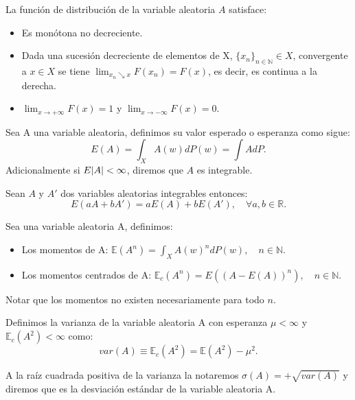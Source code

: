 \documentclass[../proyecto.tex]{memoir}
\begin{document}
\begin{prop}
La función de distribución de la variable aleatoria $A$ satisface:

\begin{itemize}
\item Es monótona no decreciente.
\item Dada una sucesión decreciente de elementos de X, $\{x_n\}_{n \in \mathds{N}} \in X$, convergente a $x\in X$ se tiene $\lim_{x_n \searrow x} F(x_n) = F(x)$, es decir, es continua a la derecha. 
\item $\lim_{x\to+\infty} F(x) = 1$ y $\lim_{x\to-\infty} F(x) = 0$.
\end{itemize}
\end{prop}

\begin{defi}
Sea A una variable aleatoria, definimos su valor esperado o esperanza como sigue:
$$
E(A) = \int_{X}A(w)dP(w) = \int AdP.
$$
Adicionalmente si $E\abs{A} < \infty$, diremos que $A$ es integrable.
\end{defi}

\begin{prop}
Sean $A$ y $A'$ dos variables aleatorias integrables entonces: $$
E(aA+bA')=aE(A)+bE(A'), \quad \forall a,b \in \mathds{R}.
$$
\end{prop}

\begin{defi}
Sea una variable aleatoria A, definimos:
\begin{itemize}
\item Los momentos de A: $\mathds{E}(A^n) = \int_{X}A(w)^{n}dP(w), \quad n \in \mathds{N}$.
\item Los momentos centrados de A: $\mathds{E}_c(A^n) = E( (A-E(A))^n ), \quad n \in \mathds{N}$.
\end{itemize}
\end{defi}

Notar que los momentos no existen necesariamente para todo $n$.

\begin{defi}
Definimos la varianza de la variable aleatoria A con esperanza $\mu < \infty$ y $\mathds{E}_c(A^2) < \infty $ como:$$
var(A) \equiv \mathds{E}_c(A^2) = \mathds{E}(A^2) - \mu^2.
$$
\end{defi}

\begin{defi}
A la raíz cuadrada positiva de la varianza la notaremos $\sigma(A)=+\sqrt{var(A)}$ y diremos que es la desviación estándar de la variable aleatoria A. 
\end{defi}
\end{document}
